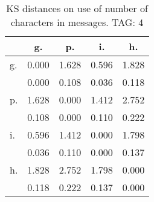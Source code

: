 \begin{table}[h!]
\begin{center}
\begin{tabular}{| l | c | c | c | c |}\hline
 & g. & p. & i. & h. \\\hline
g. & 0.000  & 1.628  & 0.596  & 1.828 \\\hline
 & 0.000  & 0.108  & 0.036  & 0.118 \\\hline
p. & 1.628  & 0.000  & 1.412  & 2.752 \\\hline
 & 0.108  & 0.000  & 0.110  & 0.222 \\\hline
i. & 0.596  & 1.412  & 0.000  & 1.798 \\\hline
 & 0.036  & 0.110  & 0.000  & 0.137 \\\hline
h. & 1.828  & 2.752  & 1.798  & 0.000 \\\hline
 & 0.118  & 0.222  & 0.137  & 0.000 \\\hline
\end{tabular}
\caption{KS distances on use of number of characters in messages. TAG: 4}
\end{center}
\end{table}